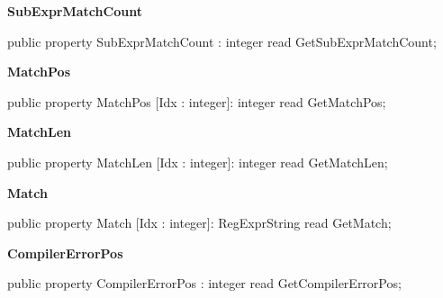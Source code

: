 \documentclass{report}
\newif\ifpdf
\begin{document}
\begin{list}{}
\begin{flushleft}
\ifpdf
\end{flushleft}
\fi


\par  \label{RegExpr.TRegExpr-SubExprMatchCount}
\item[\textbf{SubExprMatchCount}\hfill]
\ifpdf
\begin{flushleft}
\fi
\begin{ttfamily}
public property SubExprMatchCount : integer read GetSubExprMatchCount;\end{ttfamily}

\ifpdf
\end{flushleft}
\fi


\par  \label{RegExpr.TRegExpr-MatchPos}
\item[\textbf{MatchPos}\hfill]
\ifpdf
\begin{flushleft}
\fi
\begin{ttfamily}
public property MatchPos [Idx : integer]: integer read GetMatchPos;\end{ttfamily}

\ifpdf
\end{flushleft}
\fi


\par  \label{RegExpr.TRegExpr-MatchLen}
\item[\textbf{MatchLen}\hfill]
\ifpdf
\begin{flushleft}
\fi
\begin{ttfamily}
public property MatchLen [Idx : integer]: integer read GetMatchLen;\end{ttfamily}

\ifpdf
\end{flushleft}
\fi


\par  \label{RegExpr.TRegExpr-Match}
\item[\textbf{Match}\hfill]
\ifpdf
\begin{flushleft}
\fi
\begin{ttfamily}
public property Match [Idx : integer]: RegExprString read GetMatch;\end{ttfamily}

\ifpdf
\end{flushleft}
\fi


\par  \label{RegExpr.TRegExpr-CompilerErrorPos}
\item[\textbf{CompilerErrorPos}\hfill]
\ifpdf
\begin{flushleft}
\fi
\begin{ttfamily}
public property CompilerErrorPos : integer read GetCompilerErrorPos;\end{ttfamily}


\end{flushleft}
\end{list}
\end{document}
